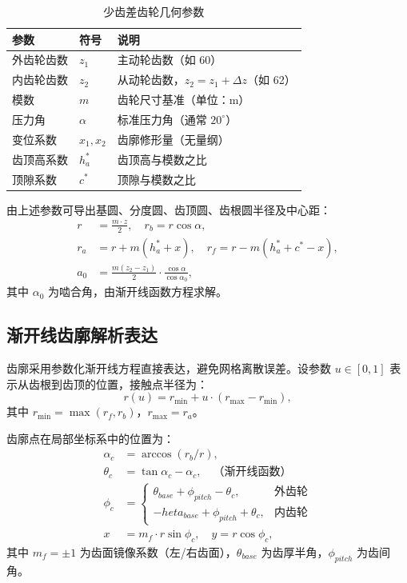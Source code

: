 \documentclass[12pt]{ctexart}
\begin{document}
\begin{table}[htbp]
\centering
\small
\begin{tabular}{lll}
\toprule
参数 & 符号 & 说明 \\ 
\midrule
外齿轮齿数 & $z_1$ & 主动轮齿数（如 60） \\ 
内齿轮齿数 & $z_2$ & 从动轮齿数，$z_2 = z_1 + \Delta z$（如 62） \\ 
模数 & $m$ & 齿轮尺寸基准（单位：m） \\ 
压力角 & $\alpha$ & 标准压力角（通常 $20^\circ$） \\ 
变位系数 & $x_1, x_2$ & 齿廓修形量（无量纲） \\ 
齿顶高系数 & $h_a^*$ & 齿顶高与模数之比 \\ 
顶隙系数 & $c^*$ & 顶隙与模数之比 \\ 
\bottomrule
\end{tabular}
\caption{少齿差齿轮几何参数}
\end{table}

由上述参数可导出基圆、分度圆、齿顶圆、齿根圆半径及中心距：
\begin{align}
r &= \frac{m \cdot z}{2}, \quad r_b = r \cos\alpha, \\ 
r_a &= r + m(h_a^* + x), \quad r_f = r - m(h_a^* + c^* - x), \\ a_0 &= \frac{m(z_2 - z_1)}{2} \cdot \frac{\cos\alpha}{\cos\alpha_0},
\end{align}
其中 $\alpha_0$ 为啮合角，由渐开线函数方程求解。

\subsection{渐开线齿廓解析表达}

齿廓采用参数化渐开线方程直接表达，避免网格离散误差。设参数 $u \in [0, 1]$ 表示从齿根到齿顶的位置，接触点半径为：
\begin{equation}
r(u) = r_{\min} + u \cdot (r_{\max} - r_{\min}),
\end{equation}
其中 $r_{\min} = \max(r_f, r_b)$，$r_{\max} = r_a$。

齿廓点在局部坐标系中的位置为：
\begin{align}
\alpha_c &= \arccos(r_b / r), \\ 
\theta_c &= \tan\alpha_c - \alpha_c, \quad \text{（渐开线函数）} \\ 
\phi_c &= \begin{cases}
\theta_{base} + \phi_{pitch} - \theta_c, & \text{外齿轮} \\ -	heta_{base} + \phi_{pitch} + \theta_c, & \text{内齿轮}
\end{cases} \\ x &= m_f \cdot r \sin\phi_c, \quad y = r \cos\phi_c,
\end{align}
其中 $m_f = \pm 1$ 为齿面镜像系数（左/右齿面），$\theta_{base}$ 为齿厚半角，$\phi_{pitch}$ 为齿间角。
\end{document}
